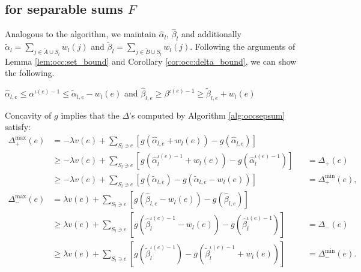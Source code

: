 \subsection{\occ{} for separable sums $F$}
Analogous to the \hogwild{} algorithm, we maintain $\hat\alpha_l$, $\hat\beta_l$ and additionally $\tilde\alpha_l = \sum_{j\in \tilde{A}\cup S_l} w_l(j)$ and $\tilde\beta_l = \sum_{j \in \tilde{B}\cup S_l} w_l(j)$.
Following the arguments of Lemma \ref{lem:occ:set_bound} and Corollary \ref{cor:occ:delta_bound}, we can show the following.
\begin{lem} $\hat\alpha_{l,e} \leq \alpha^{\iota(e)-1} \leq \tilde\alpha_{l,e} - w_l(e)$ and $\hat\beta_{l,e} \geq \beta^{\iota(e)-1} \geq \tilde\beta_{l,e} + w_l(e)$
\end{lem}

\begin{cor} Concavity of $g$ implies that the $\Delta$'s computed by Algorithm \ref{alg:occsepsum} satisfy:
\begin{align*}
\Delta_+^{\max}(e)
&= - \lambda v(e) + \sum_{S_l \ni e} \left[g(\hat\alpha_{l,e} + w_l(e)) - g(\hat\alpha_{l,e})\right]\\
&\geq - \lambda v(e) + \sum_{S_l \ni e} \left[g(\hat\alpha_l^{\iota(e)-1} + w_l(e)) - g(\hat\alpha_l^{\iota(e)-1})\right]
&&= \Delta_+(e)\\
&\geq - \lambda v(e) + \sum_{S_l \ni e} \left[g(\tilde\alpha_{l,e}) - g(\tilde\alpha_{l,e} - w_l(e))\right]
&&= \Delta_+^{\min}(e),\\
\Delta_-^{\max}(e)
&= \lambda v(e) + \sum_{S_l \ni e} \left[g(\hat\beta_{l,e} - w_l(e)) - g(\hat\beta_{l,e})\right]\\
&\geq \lambda v(e) + \sum_{S_l \ni e} \left[g(\hat\beta_l^{\iota(e)-1} - w_l(e)) - g(\hat\beta_l^{\iota(e)-1})\right]
&&= \Delta_-(e)\\
&\geq \lambda v(e) + \sum_{S_l \ni e} \left[g(\tilde\beta_l^{\iota(e)-1}) - g(\tilde\beta_l^{\iota(e)-1} + w_l(e))\right]
&&= \Delta_-^{\min}(e).
\end{align*}
\end{cor}
